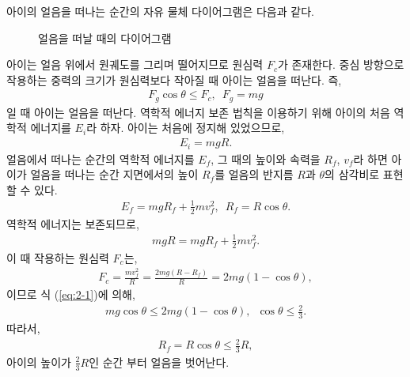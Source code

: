 \documentclass[floatfix,nofootinbib,superscriptaddress,fleqn]{revtex4-2}
\begin{document}
아이의 얼음을 떠나는 순간의 자유 물체 다이어그램은 다음과 같다.
\begin{figure}[htbp] 
  \centering
  \caption{얼음을 떠날 때의 다이어그램}
\end{figure}
아이는 얼음 위에서 원궤도를 그리며 떨어지므로 원심력 $F_c$가 존재한다. 
중심 방향으로 작용하는 중력의 크기가 원심력보다 작아질 때 아이는 얼음을 떠난다.
즉,
\begin{align}\label{eq:2-1}
  F_g\cos{\theta} \leq F_c,\,\,\,F_g = mg
\end{align}
일 때 아이는 얼음을 떠난다. 역학적 에너지 보존 법칙을 이용하기 위해 
아이의 처음 역학적 에너지를 $E_i$라 하자. 
아이는 처음에 정지해 있었으므로,
\begin{align}
  E_i = mgR.
\end{align}
얼음에서 떠나는 순간의 역학적 에너지를 $E_f$, 그 때의 높이와 속력을 
$R_f$, $v_f$라 하면 아이가 얼음을 떠나는 순간 지면에서의 높이 
$R_f$를 얼음의 반지름 $R$과 $\theta$의 삼각비로 표현할 수 있다.
\begin{align}
  E_f = mgR_f + \frac{1}{2}mv_f^2,\,\,\,R_f=R\cos{\theta}.
\end{align}
 역학적 에너지는 보존되므로,
\begin{align}
  mgR = mgR_f + \frac{1}{2}mv_f^2.
\end{align}
이 때 작용하는 원심력 $F_c$는,
\begin{align}
  F_c = \frac{mv_f^2}{R} = \frac{2mg(R-R_f)}{R}
  = 2mg\left(1-\cos{\theta}\right),
\end{align}
이므로 식 (\ref{eq:2-1})에 의해,
\begin{align}
  mg\cos{\theta} \leq 2mg\left(1-\cos{\theta}\right),\,\,\,
  \cos{\theta} \leq \frac{2}{3}.
\end{align}
따라서,
\begin{align}
  R_f = R\cos{\theta} \leq \frac{2}{3}R,
\end{align}
아이의 높이가 $\frac{2}{3}R$인 순간 부터 얼음을 벗어난다.

\vspace{1cm}
\end{document}
